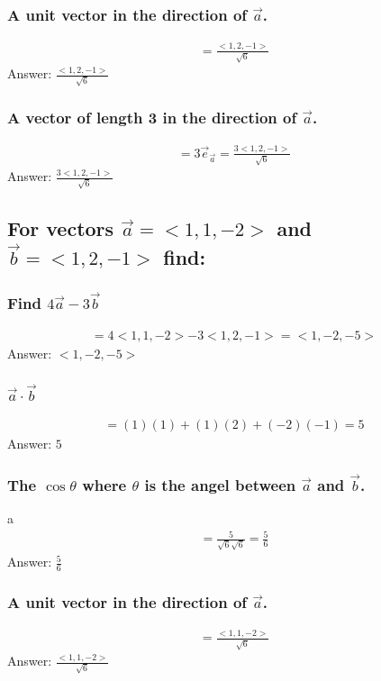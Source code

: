 \documentclass{article}
\begin{document}
\subsubsection{A unit vector in the direction of $\vec{a}$.}
\begin{align*}
	= \frac{<1, 2, -1>}{\sqrt{6}}
\end{align*}
Answer: $\frac{<1, 2, -1>}{\sqrt{6}}$

\subsubsection{A vector of length 3 in the direction of $\vec{a}$.}
\begin{align*}
	= 3 \vec{e}_{\vec{a}} = \frac{3<1, 2, -1>}{\sqrt{6}}
\end{align*}
Answer: $\frac{3<1, 2, -1>}{\sqrt{6}}$

\subsection{For vectors $\vec{a} = <1, 1, -2>$ and $\vec{b} = <1, 2, -1>$ find:}
\subsubsection{Find $4\vec{a} - 3\vec{b}$}
\begin{align*}
	= 4<1, 1, -2> - 3<1, 2, -1> = <1, -2, -5>
\end{align*}
Answer: $<1, -2, -5>$

\subsubsection{$\vec{a} \cdot \vec{b}$}
\begin{align*}
	= (1)(1) + (1)(2) + (-2)(-1) = 5
\end{align*}
Answer: $5$

\subsubsection{The $\cos{\theta}$ where $\theta$ is the angel between $\vec{a}$ and $\vec{b}$.}a
\begin{align*}
	= \frac{5}{\sqrt{6}\sqrt{6}} = \frac{5}{6}
\end{align*}
Answer: $\frac{5}{6}$

\subsubsection{A unit vector in the direction of $\vec{a}$.}
\begin{align*}
	= \frac{<1, 1, -2>}{\sqrt{6}}
\end{align*}
Answer: $\frac{<1, 1, -2>}{\sqrt{6}}$
\end{document}
